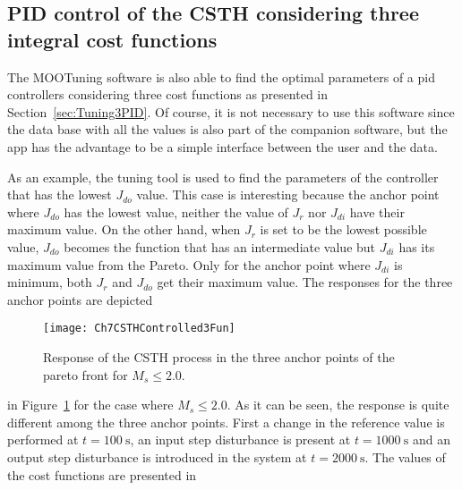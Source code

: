 \subsection{PID control of the CSTH considering three integral cost functions}
\label{sec:PIDCSTH3Fun}
The MOOTuning software is also able to find the optimal parameters of a \gls{pid} controllers considering three cost functions as presented in Section~\ref{sec:Tuning3PID}. Of course, it is not necessary to use this software since the data base with all the values is also part of the companion software, but the \matlab{} app has the advantage to be a simple interface between the user and the data.

As an example, the tuning tool is used to find the parameters of the controller that has the lowest $J_{do}$ value. This case is interesting because the anchor point where $J_{do}$ has the lowest value, neither the value of $J_r$ nor $J_{di}$ have their maximum value. On the other hand, when $J_{r}$ is set to be the lowest possible value, $J_{do}$ becomes the function that has an intermediate value but $J_{di}$ has its maximum value from the Pareto. Only for the anchor point where $J_{di}$ is minimum, both $J_r$ and $J_{do}$ get their maximum value. The responses for the three anchor points are depicted %
\begin{figure}[tb]
	\centering
	\texttt{[image: Ch7CSTHControlled3Fun]}
	\caption{Response of the CSTH process in the three anchor points of the pareto front for $M_s \leq 2.0$.}
	\label{fig:Ch7CSTHControlled3Fun}
\end{figure}
%
in Figure~\ref{fig:Ch7CSTHControlled3Fun} for the case where $M_s \leq 2.0$. As it can be seen, the response is quite different among the three anchor points. First a change in the reference value is performed at $t=\SI{100}{\second}$, an input step disturbance is present at $t=\SI{1000}{\second}$ and an output step disturbance is introduced in the system at $t=\SI{2000}{\second}$. The values of the cost functions are presented in %
%
